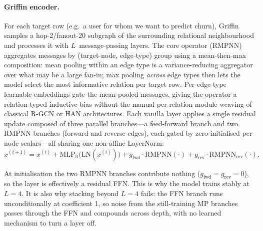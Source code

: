 \documentclass{article}
\begin{document}
\paragraph{Griffin encoder.}
For each target row (e.g.\ a user for whom we want to predict churn), Griffin samples a hop-2/fanout-20 subgraph of the surrounding relational neighbourhood and processes it with $L$~message-passing layers. The core operator (RMPNN) aggregates messages by (target-node, edge-type) group using a mean-then-max composition: mean pooling within an edge type is a variance-reducing aggregator over what may be a large fan-in; max pooling \emph{across} edge types then lets the model select the most informative relation per target row. Per-edge-type learnable embeddings gate the mean-pooled messages, giving the operator a relation-typed inductive bias without the manual per-relation module weaving of classical R-GCN or HAN architectures. Each vanilla layer applies a single residual update composed of three parallel branches---a feed-forward branch and two RMPNN branches (forward and reverse edges), each gated by zero-initialised per-node scalars---all sharing one non-affine LayerNorm:
\begin{equation}
  x^{(i+1)} = x^{(i)} + \mathrm{MLP}_{\text{ff}}\big(\mathrm{LN}(x^{(i)})\big) + g_{\text{fwd}}\!\cdot\!\mathrm{RMPNN}(\cdot) + g_{\text{rev}}\!\cdot\!\mathrm{RMPNN}_{\text{rev}}(\cdot). \label{eq:vanilla}
\end{equation}

At initialisation the two RMPNN branches contribute nothing ($g_{\text{fwd}}\!=\!g_{\text{rev}}\!=\!0$), so the layer is effectively a residual FFN. This is why the model trains stably at $L{=}4$. It is also why stacking beyond $L{=}4$ fails: the FFN branch runs unconditionally at coefficient 1, so noise from the still-training MP branches passes through the FFN and compounds across depth, with no learned mechanism to turn a layer off.
\end{document}
